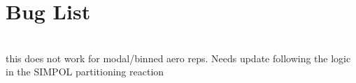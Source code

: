 \chapter{Bug List}
\hypertarget{bug}{}\label{bug}

\begin{DoxyRefList}
\item[Member \doxylink{rxn___h_l__phase__transfer_8c_aa82a07e921e3d22fda1d52073b16219d}{rxn\+\_\+\+HL\+\_\+phase\+\_\+transfer\+\_\+calc\+\_\+deriv\+\_\+contrib} (Model\+Data \texorpdfstring{$\ast$}{*}model\+\_\+data, Time\+Derivative time\+\_\+deriv, int \texorpdfstring{$\ast$}{*}rxn\+\_\+int\+\_\+data, double \texorpdfstring{$\ast$}{*}rxn\+\_\+float\+\_\+data, double \texorpdfstring{$\ast$}{*}rxn\+\_\+env\+\_\+data, realtype time\+\_\+step)]\hfill \\
\label{bug__bug000001}%
%
this does not work for modal/binned aero reps. Needs update following the logic in the SIMPOL partitioning reaction
\end{DoxyRefList}